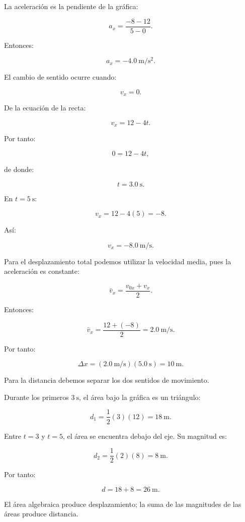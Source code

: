 \begin{explicacion}
La aceleración es la pendiente de la gráfica:

\[
a_x
=
\frac{-8-12}{5-0}.
\]

Entonces:

\[ \boxed{a_x=-\SI{4.0}{\meter\per\second\squared}}. \]

El cambio de sentido ocurre cuando:

\[ v_x=0. \]

De la ecuación de la recta:

\[ v_x=12-4t. \]

Por tanto:

\[
0=12-4t,
\]

de donde:

\[ \boxed{t=\SI{3.0}{\second}}. \]

En \(t=\SI{5}{\second}\):

\[
v_x=12-4(5)=-8.
\]

Así:

\[ \boxed{v_x=-\SI{8.0}{\meter\per\second}}. \]

Para el desplazamiento total podemos utilizar la velocidad media, pues la aceleración es constante:

\[
\bar{v}_x
=
\frac{v_{0x}+v_x}{2}.
\]

Entonces:

\[
\bar{v}_x
=
\frac{12+(-8)}{2}
=
\SI{2.0}{\meter\per\second}.
\]

Por tanto:

\[
\Delta x
=
(\SI{2.0}{\meter\per\second})
(\SI{5.0}{\second})
=
\boxed{\SI{10}{\meter}}.
\]

Para la distancia debemos separar los dos sentidos de movimiento.

Durante los primeros \(\SI{3}{\second}\), el área bajo la gráfica es un triángulo:

\[
d_1
=
\frac{1}{2}(3)(12)
=
\SI{18}{\meter}.
\]

Entre \(t=3\) y \(t=5\), el área se encuentra debajo del eje. Su magnitud es:

\[
d_2
=
\frac{1}{2}(2)(8)
=
\SI{8}{\meter}.
\]

Por tanto:

\[
d
=
18+8
=
\boxed{\SI{26}{\meter}}.
\]

El área algebraica produce desplazamiento; la suma de las magnitudes de las áreas produce distancia.
\end{explicacion}


